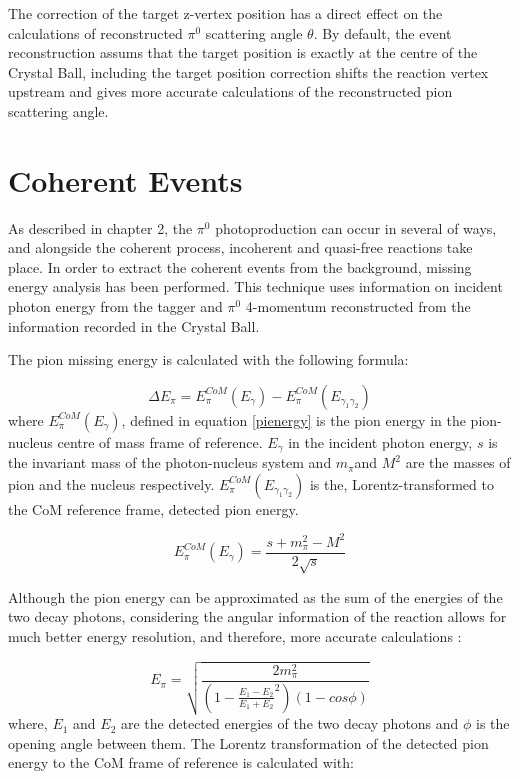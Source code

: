 \indent The correction of the target z-vertex position has a direct effect on the calculations of reconstructed $\pi^{0}$ scattering angle $\theta$. By default, the event reconstruction assums that the target position is exactly at the centre of the Crystal Ball, including the target position correction shifts the reaction vertex upstream and gives more accurate calculations of the reconstructed pion scattering angle.

\section{Coherent Events}

\indent As described in chapter 2, the $\pi^{0}$ photoproduction can occur in several of ways, and alongside the coherent process, incoherent and quasi-free reactions take place. In order to extract the coherent events from the background, missing energy analysis has been performed. This technique uses information on incident photon energy from the tagger and $\pi^{0}$ 4-momentum reconstructed from the information recorded in the Crystal Ball.

\indent The pion missing energy is calculated with the following formula:

\begin{equation}
\Delta E_{\pi} = E_{\pi}^{CoM}(E_{\gamma})-E_{\pi}^{CoM}(E_{\gamma_{1}\gamma_{2}})
\end{equation}
where $E_{\pi}^{CoM}(E_{\gamma})$, defined in equation \ref{pienergy} is the pion energy in the pion-nucleus centre of mass frame of reference. $E_{\gamma}$ in the incident photon energy, $s$ is the invariant mass of the photon-nucleus system and $m_{\pi}$and $M^{2}$ are the masses of pion  and the nucleus respectively. $E_{\pi}^{CoM}(E_{\gamma_{1}\gamma_{2}})$ is the, Lorentz-transformed to the CoM reference frame, detected pion energy.

\begin{equation}
E_{\pi}^{CoM}(E_{\gamma})=\frac{s+m_{\pi}^{2}-M^{2}}{2\sqrt{s}}
\label{pienergy}
\end{equation}

\indent Although the pion energy can be approximated as the sum of the energies of the two decay photons, considering the angular information of the reaction allows for much better energy resolution, and therefore, more accurate calculations \cite{miller}:

\begin{equation}
E_{\pi} = \sqrt{\frac{2m_{\pi}^{2}}{(1-\frac{E_{1}-E_{2}}{E_{1}+E_{2}}^{2})(1-cos\phi)}}
\end{equation}
where, $E_{1}$ and $E_{2}$ are the detected energies of the two decay photons and $\phi$ is the opening angle between them. The Lorentz transformation of the detected pion energy to the CoM frame of reference is calculated with:

